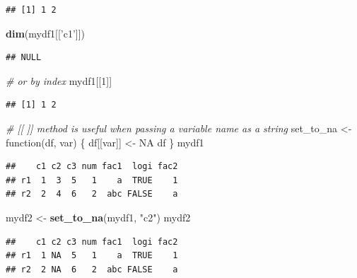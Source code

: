 \documentclass[]{book}
\newenvironment{Shaded}{\begin{snugshade}}{\end{snugshade}}
\newcommand{\KeywordTok}[1]{\textcolor[rgb]{0.13,0.29,0.53}{\textbf{{#1}}}}
\newcommand{\DecValTok}[1]{\textcolor[rgb]{0.00,0.00,0.81}{{#1}}}
\newcommand{\StringTok}[1]{\textcolor[rgb]{0.31,0.60,0.02}{{#1}}}
\newcommand{\CommentTok}[1]{\textcolor[rgb]{0.56,0.35,0.01}{\textit{{#1}}}}
\newcommand{\OtherTok}[1]{\textcolor[rgb]{0.56,0.35,0.01}{{#1}}}
\newcommand{\NormalTok}[1]{{#1}}
\theoremstyle{definition}
\theoremstyle{definition}
\theoremstyle{remark}
\begin{document}
\begin{verbatim}
## [1] 1 2
\end{verbatim}

\begin{Shaded}
\begin{Highlighting}[]
\KeywordTok{dim}\NormalTok{(mydf1[[}\StringTok{'c1'}\NormalTok{]])}
\end{Highlighting}
\end{Shaded}

\begin{verbatim}
## NULL
\end{verbatim}

\begin{Shaded}
\begin{Highlighting}[]
\CommentTok{# or by index }
\NormalTok{mydf1[[}\DecValTok{1}\NormalTok{]]}
\end{Highlighting}
\end{Shaded}

\begin{verbatim}
## [1] 1 2
\end{verbatim}

\begin{Shaded}
\begin{Highlighting}[]
\CommentTok{# [[ ]] method is useful when passing a variable name as a string}
\NormalTok{set_to_na <-}\StringTok{ }\NormalTok{function(df, var) \{}
                \NormalTok{df[[var]] <-}\StringTok{ }\OtherTok{NA}  
                \NormalTok{df }
              \NormalTok{\}}
\NormalTok{mydf1}
\end{Highlighting}
\end{Shaded}

\begin{verbatim}
##    c1 c2 c3 num fac1  logi fac2
## r1  1  3  5   1    a  TRUE    1
## r2  2  4  6   2  abc FALSE    a
\end{verbatim}

\begin{Shaded}
\begin{Highlighting}[]
\NormalTok{mydf2 <-}\StringTok{ }\KeywordTok{set_to_na}\NormalTok{(mydf1, }\StringTok{"c2"}\NormalTok{) }
\NormalTok{mydf2}
\end{Highlighting}
\end{Shaded}

\begin{verbatim}
##    c1 c2 c3 num fac1  logi fac2
## r1  1 NA  5   1    a  TRUE    1
## r2  2 NA  6   2  abc FALSE    a
\end{verbatim}
\end{document}
